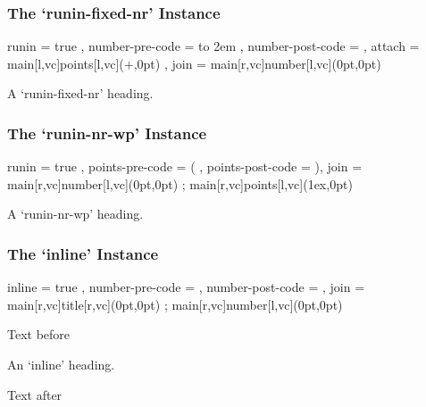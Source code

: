 \documentclass[DIV10,toc=index,toc=bib,numbers=noendperiod]{cnpkgdoc}
\begin{document}
\subsubsection{The `runin-fixed-nr' Instance}
\begin{beispiel}
  {
    runin            = true ,
    number-pre-code  = \hbox to 2em \bgroup ,
    number-post-code = \hfil\egroup ,
    attach           =
      { main[l,vc]points[l,vc](\linewidth+\marginparsep,0pt) } ,
    join             = { main[r,vc]number[l,vc](0pt,0pt) }
  }
\end{beispiel}
\begin{question}{1}
 A `runin-fixed-nr' heading. \sample
\end{question}

\subsubsection{The `runin-nr-wp' Instance}
\begin{beispiel}
  {
    runin            = true ,
    points-pre-code  = ( ,
    points-post-code = )\space ,
    join             =
      {
        main[r,vc]number[l,vc](0pt,0pt) ;
        main[r,vc]points[l,vc](1ex,0pt)
      }
  }
\end{beispiel}
\begin{question}{1}
 A `runin-nr-wp' heading. \sample
\end{question}

\subsubsection{The `inline' Instance}
\begin{beispiel}
  {
    inline           = true ,
    number-pre-code  = \space ,
    number-post-code = \space ,
    join             =
      {
        main[r,vc]title[r,vc](0pt,0pt) ;
        main[r,vc]number[l,vc](0pt,0pt)
      }
  }
\end{beispiel}
Text before
\begin{question}{1}
 An `inline' heading. \sample
\end{question}
 Text after
\end{document}
